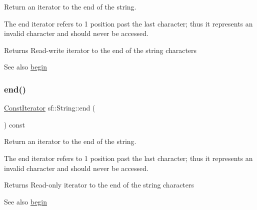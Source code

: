 Return an iterator to the end of the string. 

The end iterator refers to 1 position past the last character; thus it represents an invalid character and should never be accessed.

\begin{DoxyReturn}{Returns}
Read-\/write iterator to the end of the string characters
\end{DoxyReturn}
\begin{DoxySeeAlso}{See also}
\mbox{\hyperlink{classsf_1_1_string_a8ec30ddc08e3a6bd11c99aed782f6dfe}{begin}} \begin{DoxyVerb}\end{DoxyVerb}
 
\end{DoxySeeAlso}
\mbox{\label{classsf_1_1_string_af1ab4c82ff2bdfb6903b4b1bb78a8e5c}} 
\subsubsection{\texorpdfstring{end()}{end()}\hspace{0.1cm}{\footnotesize\ttfamily [2/2]}}
{\footnotesize\ttfamily \mbox{\hyperlink{classsf_1_1_string_a8e18efc2e8464f6eb82818902d527efa}{Const\+Iterator}} sf\+::\+String\+::end (\begin{DoxyParamCaption}{ }\end{DoxyParamCaption}) const}



Return an iterator to the end of the string. 

The end iterator refers to 1 position past the last character; thus it represents an invalid character and should never be accessed.

\begin{DoxyReturn}{Returns}
Read-\/only iterator to the end of the string characters
\end{DoxyReturn}
\begin{DoxySeeAlso}{See also}
\mbox{\hyperlink{classsf_1_1_string_a8ec30ddc08e3a6bd11c99aed782f6dfe}{begin}} \begin{DoxyVerb}\end{DoxyVerb}
 
\end{DoxySeeAlso}
\mbox{\label{classsf_1_1_string_aaa78a0a46b3fbe200a4ccdedc326eb93}} 
